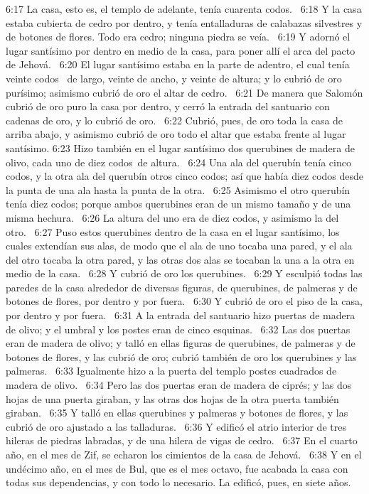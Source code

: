6:17 La casa, esto es, el templo de adelante, tenía cuarenta codos.  
6:18 Y la casa estaba cubierta de cedro por dentro, y tenía entalladuras de calabazas silvestres y de botones de flores. Todo era cedro; ninguna piedra se veía.  
6:19 Y adornó el lugar santísimo por dentro en medio de la casa, para poner allí el arca del pacto de Jehová.  
6:20 El lugar santísimo estaba en la parte de adentro, el cual tenía veinte codos  de largo, veinte de ancho, y veinte de altura; y lo cubrió de oro purísimo; asimismo cubrió de oro el altar de cedro.  
6:21 De manera que Salomón cubrió de oro puro la casa por dentro, y cerró la entrada del santuario con cadenas de oro, y lo cubrió de oro.  
6:22 Cubrió, pues, de oro toda la casa de arriba abajo, y asimismo cubrió de oro todo el altar que estaba frente al lugar santísimo. 
6:23 Hizo también en el lugar santísimo dos querubines de madera de olivo, cada uno de diez codos de altura.  
6:24 Una ala del querubín tenía cinco codos, y la otra ala del querubín otros cinco codos; así que había diez codos desde la punta de una ala hasta la punta de la otra.  
6:25 Asimismo el otro querubín tenía diez codos; porque ambos querubines eran de un mismo tamaño y de una misma hechura.  
6:26 La altura del uno era de diez codos, y asimismo la del otro.  
6:27 Puso estos querubines dentro de la casa en el lugar santísimo, los cuales extendían sus alas, de modo que el ala de uno tocaba una pared, y el ala del otro tocaba la otra pared, y las otras dos alas se tocaban la una a la otra en medio de la casa.  
6:28 Y cubrió de oro los querubines.  
6:29 Y esculpió todas las paredes de la casa alrededor de diversas figuras, de querubines, de palmeras y de botones de flores, por dentro y por fuera.  
6:30 Y cubrió de oro el piso de la casa, por dentro y por fuera.  
6:31 A la entrada del santuario hizo puertas de madera de olivo; y el umbral y los postes eran de cinco esquinas.  
6:32 Las dos puertas eran de madera de olivo; y talló en ellas figuras de querubines, de palmeras y de botones de flores, y las cubrió de oro; cubrió también de oro los querubines y las palmeras.  
6:33 Igualmente hizo a la puerta del templo postes cuadrados de madera de olivo.  
6:34 Pero las dos puertas eran de madera de ciprés; y las dos hojas de una puerta giraban, y las otras dos hojas de la otra puerta también giraban.  
6:35 Y talló en ellas querubines y palmeras y botones de flores, y las cubrió de oro ajustado a las talladuras.  
6:36 Y edificó el atrio interior de tres hileras de piedras labradas, y de una hilera de vigas de cedro.  
6:37 En el cuarto año, en el mes de Zif, se echaron los cimientos de la casa de Jehová.  
6:38 Y en el undécimo año, en el mes de Bul, que es el mes octavo, fue acabada la casa con todas sus dependencias, y con todo lo necesario. La edificó, pues, en siete años.  
